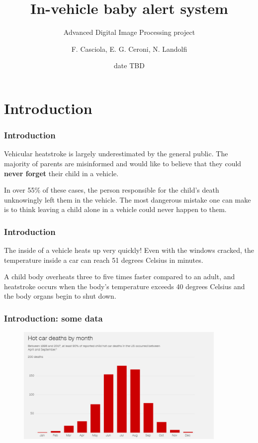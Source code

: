 \documentclass{beamer}
\title{In-vehicle baby alert system}
\subtitle{Advanced Digital Image Processing project}
\author{F. Casciola, E. G. Ceroni, N. Landolfi} %
\institute[Unisi]{Università degli Studi di Siena}
\date{date TBD}
\begin{document}
	
	\frame{\titlepage}
	
	\section{Introduction}
	
	\begin{frame}
		\frametitle{Introduction}
		Vehicular heatstroke is largely underestimated by the general public. The majority of parents are misinformed and would like to believe that they could \textbf{never forget} their child in a vehicle.
		
		In over 55\% of these cases, the person responsible for the child’s death unknowingly left them in the vehicle. The most dangerous mistake one can make is to think leaving a child alone in a vehicle could never happen to them.
	\end{frame}

	\begin{frame}
		\frametitle{Introduction}
		The inside of a vehicle heats up very quickly! Even with the windows cracked, the temperature inside a car can reach 51 degrees Celsius in minutes.
		
		A child body overheats three to five times faster compared to an adult, and heatstroke occurs when the body's temperature exceeds 40 degrees Celsius and the body organs begin to shut down.
	\end{frame}

	\begin{frame}
		\frametitle{Introduction: some data}
		\begin{figure}
			\centering
			\includegraphics[width=0.9\textwidth]{img/histo-by-month.png}
			\label{fig:heatstroke_month}
		\end{figure}		
	\end{frame}
\end{document}
